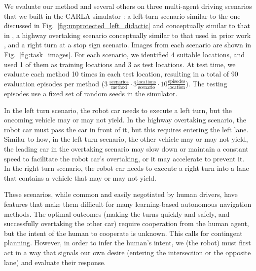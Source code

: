 \documentclass[conference]{IEEEtran}
\begin{document}
We evaluate our method and several others on three multi-agent driving scenarios that we built in the CARLA simulator \citep{dosovitskiy_carla_2017}: a left-turn scenario similar to the one discussed in Fig.~\ref{fig:unprotected_left_didactic} and conceptually similar to that in \cite{hardy2013contingency}, a highway overtaking scenario conceptually similar to that used in prior work \citep{sadigh2016planning,fisac2019hierarchical}, and a right turn at a stop sign scenario. Images from each scenario are shown in Fig.~\ref{fig:task_images}. For each scenario, we identified 4 suitable locations, and used 1 of them as training locations and 3 as test locations. At test time, we evaluate each method 10 times in each test location, resulting in a total of 90 evaluation episodes per method ($3~\frac{\mathrm{scenarios}}{\mathrm{method}}\cdot 3\frac{\mathrm{locations}}{\mathrm{scenario}}\cdot10\frac{\mathrm{episodes}}{\mathrm{location}}$). The testing episodes use a fixed set of random seeds in the simulator. 

In the left turn scenario, the robot car needs to execute a left turn, but the oncoming vehicle may or may not yield.
In the highway overtaking scenario, the robot car must pass the car in front of it, but this requires entering the left lane. Similar to how, in the left turn scenario, the other vehicle may or may not yield, the leading car in the overtaking scenario may slow down or maintain a constant speed to facilitate the robot car's overtaking, or it may accelerate to prevent it.
In the right turn scenario, the robot car needs to execute a right turn into a lane that contains a vehicle that may or may not yield.

These scenarios, while common and easily negotiated by human drivers, have features that make them difficult for many learning-based autonomous navigation methods.
The optimal outcomes (making the turns quickly and safely, and successfully overtaking the other car) require cooperation from the human agent, but the intent of the human to cooperate is unknown.
This calls for contingent planning.
However, in order to infer the human's intent, we (the robot) must first act in a way that signals our own desire (entering the intersection or the opposite lane) and evaluate their response.

\vspace{-.5em}
\end{document}
